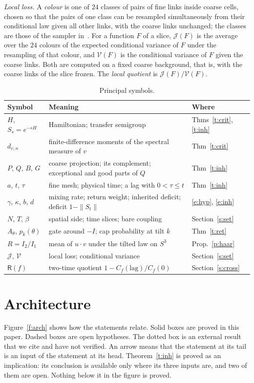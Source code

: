 \emph{Local loss.} A \emph{colour} is one of $24$ classes of pairs of fine links inside coarse cells, chosen so
that the pairs of one class can be resampled simultaneously from their conditional law given all other links,
with the coarse links unchanged; the classes are those of the sampler in~\cite{Repo}. For a function $F$ of a
slice, $\mathcal J(F)$ is the average over the $24$ colours of the expected conditional variance of $F$ under
the resampling of that colour, and $\mathcal V(F)$ is the conditional variance of $F$ given the coarse links.
Both are computed on a fixed coarse background, that is, with the coarse links of the slice frozen. The
\emph{local quotient} is $\mathcal J(F)/\mathcal V(F)$.

\begin{table}[ht]
\centering\small
\begin{tabular}{@{}lll@{}}
\toprule
Symbol & Meaning & Where \\
\midrule
$H$, $S_s=e^{-sH}$ & Hamiltonian; transfer semigroup & Thms~\ref{t:crit}, \ref{t:inh} \\
$d_{v,n}$ & finite-difference moments of the spectral measure of $v$ & Thm~\ref{t:crit} \\
$P$, $Q$, $B$, $G$ & coarse projection; its complement; exceptional and good parts of $Q$ & Thm~\ref{t:inh} \\
$a$, $t$, $\tau$ & fine mesh; physical time; a lag with $0<\tau\le t$ & Thm~\ref{t:inh} \\
$\gamma$, $\kappa$, $b$, $d$ & mixing rate; return weight; inherited deficit; deficit $1-\|S_t\|$ & \eqref{e:hyp}, \eqref{e:inh} \\
$N$, $T$, $\beta$ & spatial side; time slices; bare coupling & Section~\ref{s:set} \\
$A_\theta$, $p_k(\theta)$ & gate around $-I$; cap probability at tilt $k$ & Thm~\ref{t:ret} \\
$R=I_2/I_1$ & mean of $u\cdot v$ under the tilted law on $S^3$ & Prop.~\ref{p:haar} \\
$\mathcal J$, $\mathcal V$ & local loss; conditional variance & Section~\ref{s:set} \\
$\mathsf R(f)$ & two-time quotient $1-C_f(\text{lag})/C_f(0)$ & Section~\ref{s:cross} \\
\bottomrule
\end{tabular}
\caption{Principal symbols.}\label{tab:sym}
\end{table}

\section{Architecture}\label{s:arch}
Figure~\ref{f:arch} shows how the statements relate. Solid boxes are proved in this paper. Dashed boxes are
open hypotheses. The dotted box is an external result that we cite and have not verified. An arrow means
that the statement at its tail is an input of the statement at its head. Theorem~\ref{t:inh} is proved as an
implication: its conclusion is available only where its three inputs are, and two of them are open. Nothing
below it in the figure is proved.

